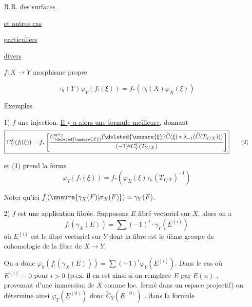 
\begin{flushright}
\uline{R.R. des surfaces}

\uline{et autres cas}

\uline{particuliers}

\uline{divers}

\end{flushright}

\(f:X\longrightarrow Y\) morphisme propre

\[
\boxed{\tau_h(Y)\varphi_Y(f_!(\xi))=f_*(\tau_h(X)\varphi_X(\xi))}\tag{1}
\]

\uline{Exemples}

1) \(f\) une injection. \uline{Il y a alors une formule meilleure}, donnant
\[
\boxed{C^j_Y(f_!(\xi))=f_*\left[\frac{C^{q+j}_{\deleted{\unsure{X}}}(\deleted{\unsure{\xi}}\widetilde C(\xi)*\lambda_{-1}(\widetilde C(T_{Y/X})))}{(-1)^q C^q_Y(T_{Y/X})}\right]}\tag{2}
\]
 

et (1) prend la forme
\[
\boxed{\varphi_Y(f_!(\xi))=f_*(\varphi_X(\xi)\tau_h(T_{Y/X})^{-1})}\tag{1bis}
\]

Noter qu'ici \(f_!(\unsure{\gamma_X(F)|\sigma_X(F)})=\gamma_Y(F)\).

2) \(f\) est une application fibrée. Supposons \(E\) fibré vectoriel sur \(X\), alors on a
\[
f_!(\gamma_X(E))=\sum(-1)^i\cdot\gamma_Y(E^{(i)})
\]
où \(E^{(i)}\) est le fibré vectoriel sur \(Y\) dont la fibre est le \(i\)ième groupe de cohomologie de la fibre de \(X\to Y\).

On a donc \(\varphi_Y(f_!(\gamma_X(E)))=\sum(-1)^i\varphi_Y(E^{(i)})\). Dans le cas où \(E^{(i)}=0\) pour \(i>0\) (p.ex. il en est ainsi si on remplace \(E\) par \(E(n)\) , provenant d'une immersion de \(X\) comme loc. fermé dans un espace projectif) on détermine ainsi \(\varphi_Y(E^{(0)})\) donc \(\widetilde C_Y(E^{(0)})\) \deleted{\(\unsure{\xi}\)}.   dans la formule

